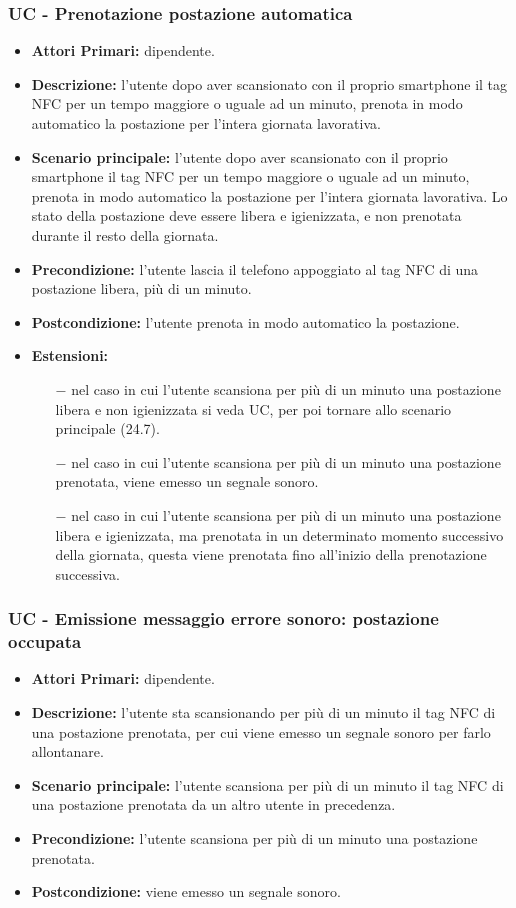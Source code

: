 \subsubsection{ UC - Prenotazione postazione automatica}
\begin{itemize}
	\item\textbf{Attori Primari:} dipendente.
	\item\textbf{Descrizione:} l’utente dopo aver scansionato con il proprio smartphone il tag NFC per un tempo maggiore o uguale ad un minuto, prenota in modo automatico la postazione per l'intera giornata lavorativa. 
	\item\textbf{Scenario principale:} l’utente dopo aver scansionato con il proprio smartphone il tag NFC per un tempo maggiore o uguale ad un minuto, prenota in modo automatico la postazione per l'intera giornata lavorativa. Lo stato della postazione deve essere libera e igienizzata, e non prenotata durante il resto della giornata.
	\item\textbf{Precondizione:} l'utente lascia il telefono appoggiato al tag NFC di una postazione libera, più di un minuto.
	\item\textbf{Postcondizione:} l'utente prenota in modo automatico la postazione.
	\item\textbf{Estensioni:}
	\begin{itemize}
		\item[$-$] nel caso in cui l'utente scansiona per più di un minuto una postazione libera e non igienizzata si veda UC, per poi tornare allo scenario principale (24.7).
		\item[$-$] nel caso in cui l'utente scansiona per più di un minuto una postazione prenotata, viene emesso un segnale sonoro.
		\item[$-$] nel caso in cui l'utente scansiona per più di un minuto una postazione libera e igienizzata, ma prenotata in un determinato momento successivo della giornata, questa viene prenotata fino all'inizio della prenotazione successiva.
	\end{itemize}
\end{itemize}
\subsubsection{ UC - Emissione messaggio errore sonoro: postazione occupata}
\begin{itemize}
	\item\textbf{Attori Primari:} dipendente.
	\item\textbf{Descrizione:} l'utente sta scansionando per più di un minuto il tag NFC di una postazione prenotata, per cui viene emesso un segnale sonoro per farlo allontanare.
	\item\textbf{Scenario principale:} l’utente scansiona per più di un minuto il tag NFC di una postazione prenotata da un altro utente in precedenza.
	\item\textbf{Precondizione:} l'utente scansiona per più di un minuto una postazione prenotata.
	\item\textbf{Postcondizione:} viene emesso un segnale sonoro.
\end{itemize}

